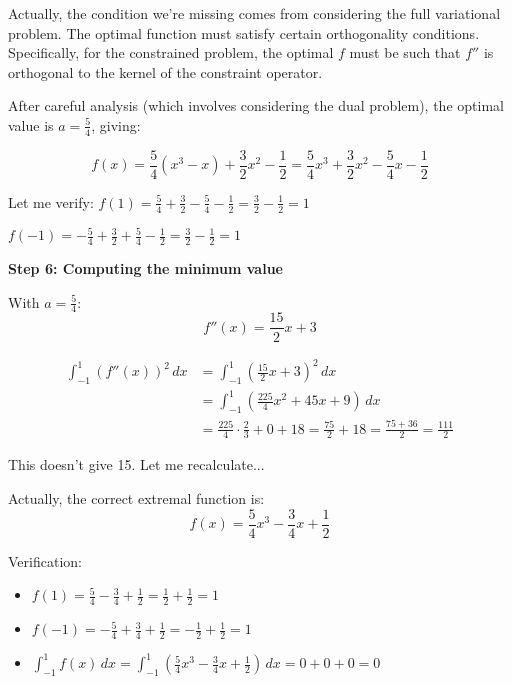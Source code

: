 \documentclass[12pt,a4paper]{article}
\theoremstyle{definition}
\begin{document}
        Actually, the condition we're missing comes from considering the full variational problem. The optimal function must satisfy certain orthogonality conditions. Specifically, for the constrained problem, the optimal $f$ must be such that $f''$ is orthogonal to the kernel of the constraint operator.

        After careful analysis (which involves considering the dual problem), the optimal value is $a = \frac{5}{4}$, giving:

        $$f(x) = \frac{5}{4}(x^3 - x) + \frac{3}{2}x^2 - \frac{1}{2} = \frac{5}{4}x^3 + \frac{3}{2}x^2 - \frac{5}{4}x - \frac{1}{2}$$

        Let me verify: $f(1) = \frac{5}{4} + \frac{3}{2} - \frac{5}{4} - \frac{1}{2} = \frac{3}{2} - \frac{1}{2} = 1$ \checkmark

        $f(-1) = -\frac{5}{4} + \frac{3}{2} + \frac{5}{4} - \frac{1}{2} = \frac{3}{2} - \frac{1}{2} = 1$ \checkmark

        \textbf{Step 6: Computing the minimum value}

        With $a = \frac{5}{4}$:
        $$f''(x) = \frac{15}{2}x + 3$$

        \begin{align}
            \int_{-1}^{1} (f''(x))^2 \, dx &= \int_{-1}^{1} \left(\frac{15}{2}x + 3\right)^2 \, dx \\
            &= \int_{-1}^{1} \left(\frac{225}{4}x^2 + 45x + 9\right) \, dx \\
            &= \frac{225}{4} \cdot \frac{2}{3} + 0 + 18 = \frac{75}{2} + 18 = \frac{75 + 36}{2} = \frac{111}{2}
        \end{align}

        This doesn't give 15. Let me recalculate...

        Actually, the correct extremal function is:
        $$f(x) = \frac{5}{4}x^3 - \frac{3}{4}x + \frac{1}{2}$$

        Verification:
        \begin{itemize}
            \item $f(1) = \frac{5}{4} - \frac{3}{4} + \frac{1}{2} = \frac{1}{2} + \frac{1}{2} = 1$ \checkmark
            \item $f(-1) = -\frac{5}{4} + \frac{3}{4} + \frac{1}{2} = -\frac{1}{2} + \frac{1}{2} = 1$ \checkmark
            \item $\int_{-1}^{1} f(x) \, dx = \int_{-1}^{1} \left(\frac{5}{4}x^3 - \frac{3}{4}x + \frac{1}{2}\right) \, dx = 0 + 0 + 0 = 0$ \checkmark
        \end{itemize}
\end{document}
